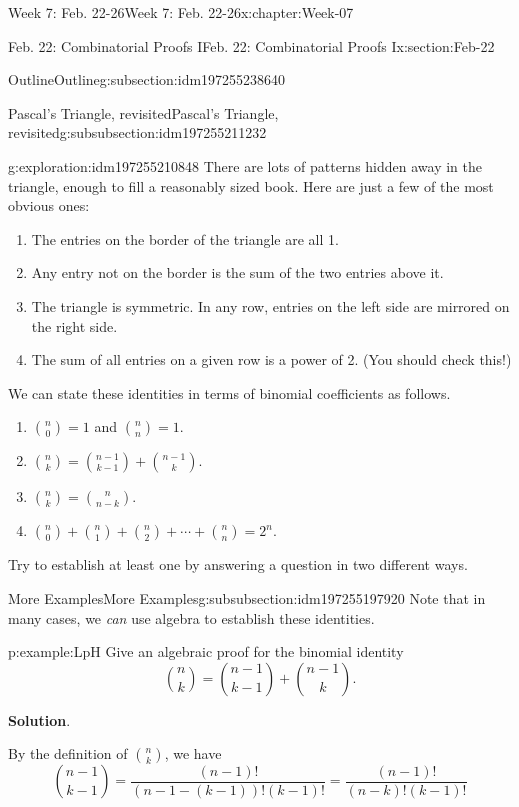 \documentclass[oneside,10pt,]{book}
\newcommand{\blocktitlefont}{\relax}
\numberwithin{equation}{section}
\begin{document}
\begin{chapterptx}{Week 7: Feb. 22-26}{}{Week 7: Feb. 22-26}{}{}{x:chapter:Week-07}
\begin{sectionptx}{Feb. 22: Combinatorial Proofs I}{}{Feb. 22: Combinatorial Proofs I}{}{}{x:section:Feb-22}
\begin{subsectionptx}{Outline}{}{Outline}{}{}{g:subsection:idm197255238640}
\begin{subsubsectionptx}{Pascal's Triangle, revisited}{}{Pascal's Triangle, revisited}{}{}{g:subsubsection:idm197255211232}
\begin{exploration}{}{g:exploration:idm197255210848}
There are lots of patterns hidden away in the triangle, enough to fill a reasonably sized book. Here are just a few of the most obvious ones:%
\begin{enumerate}
\item{}The entries on the border of the triangle are all 1.%
\item{}Any entry not on the border is the sum of the two entries above it.%
\item{}The triangle is symmetric. In any row, entries on the left side are mirrored on the right side.%
\item{}The sum of all entries on a given row is a power of 2. (You should check this!)%
\end{enumerate}
We can state these identities in terms of binomial coefficients as follows.%
%
\begin{enumerate}
\item{}\({n \choose 0} = 1\) and \({n \choose n} = 1\).%
\item{}\({n \choose k} = {n-1 \choose k-1} + {n-1 \choose k}\).%
\item{}\({n \choose k} = {n \choose n-k}\).%
\item{}\({n\choose 0} + {n \choose 1} + {n \choose 2} + \cdots + {n \choose n} = 2^n\).%
\end{enumerate}
Try to establish at least one by answering a question in two different ways.%
\end{exploration}%
\end{subsubsectionptx}
%
%
\typeout{************************************************}
\typeout{************************************************}
%
\begin{subsubsectionptx}{More Examples}{}{More Examples}{}{}{g:subsubsection:idm197255197920}
Note that in many cases, we \emph{can} use algebra to establish these identities.%
\begin{example}{}{p:example:LpH}%
Give an algebraic proof for the binomial identity%
\begin{equation*}
{n \choose k} = {n-1\choose k-1} + {n-1 \choose k}\text{.}
\end{equation*}
%
\par\smallskip%
\noindent\textbf{\blocktitlefont Solution}.\hypertarget{p:solution:AQC}{}\quad{}\begin{solutionproof}
By the definition of \({n \choose k}\), we have%
\begin{equation*}
{n-1 \choose k-1} = \frac{(n-1)!}{(n-1-(k-1))!(k-1)!} = \frac{(n-1)!}{(n-k)!(k-1)!}

\end{equation*}
\end{solutionproof}
\end{example}
\end{subsubsectionptx}
\end{subsectionptx}
\end{sectionptx}
\end{chapterptx}
\end{document}
